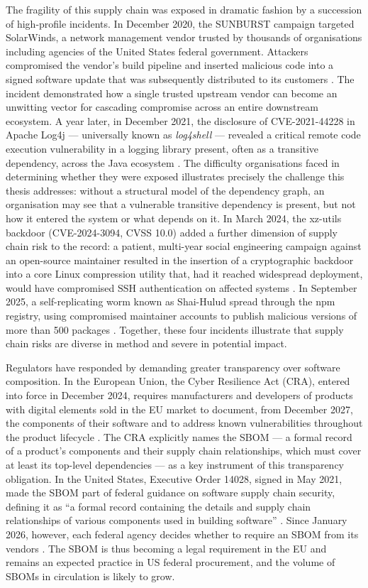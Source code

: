 The fragility of this supply chain was exposed in dramatic fashion by a succession of high-profile incidents. In December 2020, the SUNBURST campaign targeted SolarWinds, a network management vendor trusted by thousands of organisations including agencies of the United States federal government. Attackers compromised the vendor's build pipeline and inserted malicious code into a signed software update that was subsequently distributed to its customers \citep{CISA_AA20_352A}. The incident demonstrated how a single trusted upstream vendor can become an unwitting vector for cascading compromise across an entire downstream ecosystem. A year later, in December 2021, the disclosure of CVE-2021-44228 in Apache Log4j --- universally known as \textit{log4shell} --- revealed a critical remote code execution vulnerability in a logging library present, often as a transitive dependency, across the Java ecosystem \citep{NIST_CVE_2021_44228, GoogleLog4j2021}. The difficulty organisations faced in determining whether they were exposed illustrates precisely the challenge this thesis addresses: without a structural model of the dependency graph, an organisation may see that a vulnerable transitive dependency is present, but not how it entered the system or what depends on it. In March 2024, the xz-utils backdoor (CVE-2024-3094, CVSS 10.0) added a further dimension of supply chain risk to the record: a patient, multi-year social engineering campaign against an open-source maintainer resulted in the insertion of a cryptographic backdoor into a core Linux compression utility that, had it reached widespread deployment, would have compromised SSH authentication on affected systems \citep{NVD_CVE_2024_3094}. In September 2025, a self-replicating worm known as Shai-Hulud spread through the npm registry, using compromised maintainer accounts to publish malicious versions of more than 500 packages \citep{CISA2025npm}. Together, these four incidents illustrate that supply chain risks are diverse in method and severe in potential impact.

Regulators have responded by demanding greater transparency over software composition. In the European Union, the Cyber Resilience Act (CRA), entered into force in December 2024, requires manufacturers and developers of products with digital elements sold in the EU market to document, from December 2027, the components of their software and to address known vulnerabilities throughout the product lifecycle \citep{CRA2024}. The CRA explicitly names the SBOM --- a formal record of a product's components and their supply chain relationships, which must cover at least its top-level dependencies --- as a key instrument of this transparency obligation. In the United States, Executive Order 14028, signed in May 2021, made the SBOM part of federal guidance on software supply chain security, defining it as ``a formal record containing the details and supply chain relationships of various components used in building software'' \citep{EO14028}. Since January 2026, however, each federal agency decides whether to require an SBOM from its vendors \citep{OMB_M2605}. The SBOM is thus becoming a legal requirement in the EU and remains an expected practice in US federal procurement, and the volume of SBOMs in circulation is likely to grow.


